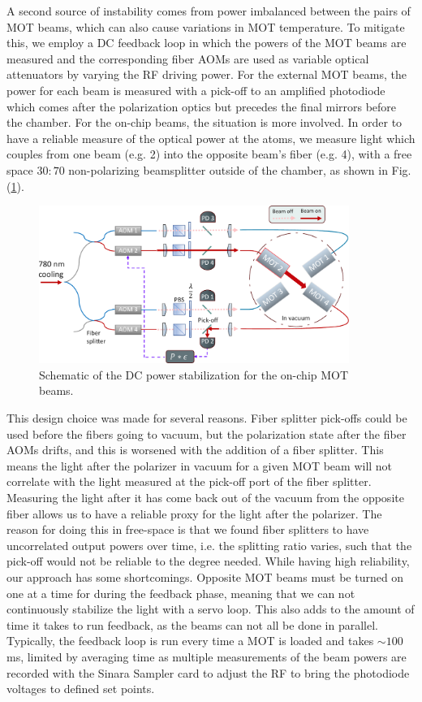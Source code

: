 A second source of instability comes from power imbalanced between the pairs of MOT beams, which can also cause variations in MOT temperature. To mitigate this, we employ a DC feedback loop in which the powers of the MOT beams are measured and the corresponding fiber AOMs are used as variable optical attenuators by varying the RF driving power. For the external MOT beams, the power for each beam is measured with a pick-off to an amplified photodiode \cite{Ebert2017thesis} which comes after the polarization optics but precedes the final mirrors before the chamber. For the on-chip beams, the situation is more involved. In order to have a reliable measure of the optical power at the atoms, we measure light which couples from one beam (e.g. 2) into the opposite beam's fiber (e.g. 4), with a free space $30:70$ non-polarizing beamsplitter outside of the chamber, as shown in Fig. (\ref{fig:mot_feedback}). 
\begin{figure}[!ht]
    \centering
    \includegraphics[width=0.9\textwidth]{Images/on_chip_mot_feedback.pdf}
    \caption{Schematic of the DC power stabilization for the on-chip
    MOT beams.}
    \label{fig:mot_feedback}
\end{figure}
This design choice was made for several reasons. Fiber splitter pick-offs could be used before the fibers going to vacuum, but the polarization state after the fiber AOMs drifts, and this is worsened with the addition of a fiber splitter. This means the light after the polarizer in vacuum for a given MOT beam will not correlate with the light measured at the pick-off port of the fiber splitter. Measuring the light after it has come back out of the vacuum  from the opposite fiber allows us to have a reliable proxy for the  light after the polarizer. The reason for doing this in free-space is that we found fiber splitters to have uncorrelated output powers over time, i.e. the splitting ratio varies, such that the pick-off would not be reliable to the degree needed. While having high reliability, our approach has some shortcomings. Opposite MOT beams must be turned on one at a time for during the feedback phase, meaning that we can not continuously stabilize the light with a servo loop. This also adds to the amount of time it takes to run feedback, as the beams can not all be done in parallel. Typically, the feedback loop is run every time a MOT is loaded and takes $\sim 100$ ms, limited by averaging time as multiple measurements of the beam powers are recorded with the Sinara Sampler card to adjust the RF to bring the photodiode voltages to defined set points.

